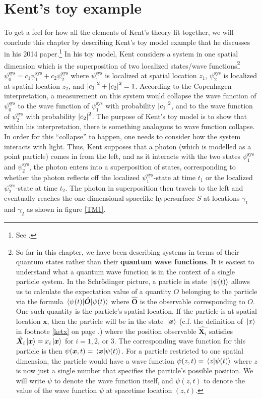 \section{Kent's toy example}\label{toysection}
To get a feel for how all the elements of Kent's theory fit together, we will conclude this chapter by describing Kent's toy model example that he discusses in his 2014 paper.\footnote{See \cite[p. 3--4]{Kent2014}.} In his toy model, Kent considers a system in one spatial dimension which is the superposition of two localized states/wave functions\footnote{So far in this chapter, we have been describing systems in terms of their quantum states rather than their \textbf{quantum wave functions}.\label{wavefunctionfootnote} It is easiest to understand what a quantum wave function is in the context of a single particle system. In the Schr\"{o}dinger picture, a particle in state $\ket*{\psi(t)}$ allows us to calculate the expectation value of a quantity $O$ belonging to the particle via the formula $\ev{\hat{\bm{O}}}{\psi(t)}$ where $\hat{\bm{O}}$ is the observable corresponding to $O$. One such quantity is the particle's spatial location. If the particle is at spatial location $\bm{x}$, then the particle will be in the state $\ket*{\bm{x}}$ (c.f. the definition of $\ket*{x}$ in footnote \ref{ketx} on page \pageref{ketx}.) where the position observable $\hat{\bm{X}_i}$ satisfies $\hat{\bm{X}_i}\ket*{\bm{x}}=x_i\ket*{\bm{x}}$ for $i=1,2$, or $3$. The corresponding wave function for this particle is then   $\psi(\bm{x}, t)=\ip*{\bm{x}}{\psi(t)}$. For a particle restricted to one spatial dimension, the particle would have a wave function $\psi(z, t)=\ip*{z}{\psi(t)}$ where $z$ is now just a single number that specifies the particle's possible position. We will write $\psi$ to denote the wave function itself, and $\psi(z,t)$ to denote the value of the wave function $\psi$ at spacetime location $(z,t)$.}  $\psi_0^\text{sys}=c_1 \psi_1^\text{sys}+c_2\psi_2^\text{sys}$ where $\psi_1^\text{sys}$ is localized at spatial location $z_1$, $\psi_2^\text{sys}$ is localized at spatial location $z_2$, and $\abs{c_1}^2+\abs{c_2}^2=1$. According to the Copenhagen interpretation, a measurement on this system would collapse the wave function of $\psi_0^\text{sys}$ to the wave function of $\psi_1^\text{sys}$ with probability $\abs{c_1}^2$, and to the wave function of $\psi_2^\text{sys}$ with probability $\abs{c_2}^2$. The purpose of Kent's toy model is to show that within his interpretation, there is something analogous to wave function collapse.  In order for this ``collapse'' to happen, one needs to consider how the system interacts with light. Thus, Kent supposes that a photon (which is modelled as a point particle) comes in from the left, and as it interacts with the two states $\psi_1^\text{sys}$ and $\psi_2^\text{sys}$, the photon enters into a superposition of states, corresponding to whether the photon reflects off the localized $\psi_1^\text{sys}$-state at time $t_1$ or the localized $\psi_2^\text{sys}$-state at time $t_2$. The photon in superposition then travels to the left and eventually reaches the one dimensional spacelike hypersurface $S$ at locations $\gamma_1$ and $\gamma_2$ as shown in figure  \ref{TM1}.


